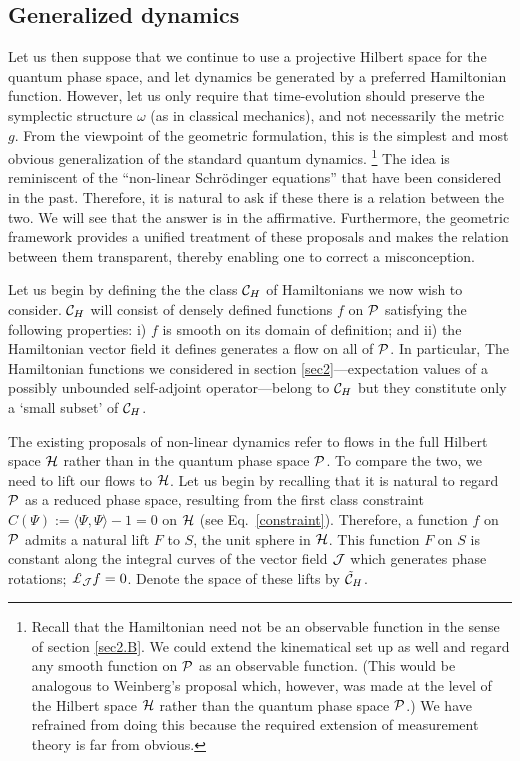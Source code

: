 \documentclass[12pt,aps,eqsecnum,tighten]{revtex4-2}
\def\<{\langle}
\def\>{\rangle}
\def\H{{\cal H}}
\def\P{{\cal P}}
\def\J{{\cal J}}
\newcommand{\lie}[1]{{\pounds}_{#1}}
\def\ch{{\cal C}_H}
\begin{document}
\subsection{Generalized dynamics} \label{sec3.A}

Let us then suppose that we continue to use a projective Hilbert space
for the quantum phase space, and let dynamics be generated by a
preferred Hamiltonian function. However, let us only require that
time-evolution should preserve the symplectic structure $\omega$ (as
in classical mechanics), and not necessarily the metric $g$. {}From
the viewpoint of the geometric formulation, this is the simplest and
most obvious generalization of the standard quantum dynamics.%
%
\footnote{Recall that the Hamiltonian need not be an observable
function in the sense of section \ref{sec2.B}. We could extend the
kinematical set up as well and regard any smooth function on $\P$ as
an observable function.  (This would be analogous to Weinberg's
\cite{weinberg} proposal which, however, was made at the level of the
Hilbert space $\H$ rather than the quantum phase space $\P$.) We have
refrained from doing this because the required extension of
measurement theory is far from obvious.}  
% 
The idea is reminiscent of the ``non-linear Schr\"odinger equations''
that have been considered in the past. Therefore, it is
natural to ask if these there is a relation between the two.  We will
see that the answer is in the affirmative. Furthermore, the geometric
framework provides a unified treatment of these proposals and makes
the relation between them transparent, thereby enabling one to correct
a misconception.

Let us begin by defining the the class $\ch$ of Hamiltonians we now
wish to consider. $\ch$ will consist of densely defined functions $f$
on $\P$ satisfying the following properties: i) $f$ is smooth on its
domain of definition; and ii) the Hamiltonian vector field it defines
generates a flow on all of $\P$.  In particular, The Hamiltonian
functions we considered in section \ref{sec2}---expectation values of
a possibly unbounded self-adjoint operator---belong to $\ch$ but they
constitute only a `small subset' of $\ch$.

The existing proposals of non-linear dynamics refer to flows in the
full Hilbert space $\H$ rather than in the quantum phase space $\P$.
To compare the two, we need to lift our flows to $\H$.  Let us begin
by recalling that it is natural to regard $\P$ as a reduced phase
space, resulting from the first class constraint $ C(\Psi) := \< \Psi,
\Psi\> -1 =0$ on $\H$ (see Eq.~\ref{constraint}).  Therefore, a
function $f$ on $\P$ admits a natural lift $F$ to $S$, the unit sphere
in $\H$. This function $F$ on $S$ is constant along the integral
curves of the vector field $\J$ which generates phase rotations;
$\lie{\J}f = 0$. Denote the space of these lifts by $\tilde\ch$.
\end{document}
